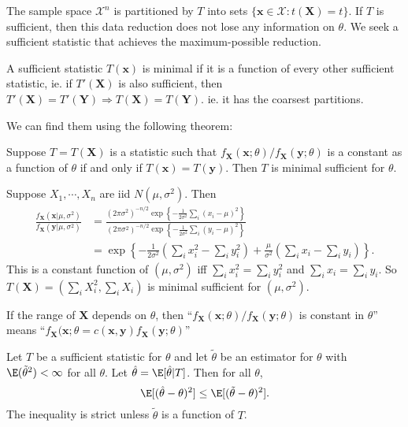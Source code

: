 \documentclass[a4paper]{article}
\begin{document}
The sample space $\mathcal{X}^n$ is partitioned by $T$ into sets $\{\mathbf{x}\in \mathcal{X}: t(\mathbf{X}) = t\}$. If $T$ is sufficient, then this data reduction does not lose any information on $\theta$. We seek a sufficient statistic that achieves the maximum-possible reduction.

\begin{defi}
  A sufficient statistic $T(\mathbf{x})$ is minimal if it is a function of every other sufficient statistic, ie. if $T'(\mathbf{X})$ is also sufficient, then $T'(\mathbf{X}) = T'(\mathbf{Y}) \Rightarrow  T(\mathbf{X}) = T(\mathbf{Y})$. ie. it has the coarsest partitions.
\end{defi}

We can find them using the following theorem:
\begin{thm}
  Suppose $T = T(\mathbf{X})$ is a statistic such that $f_\mathbf{X}(\mathbf{x}; \theta)/f_\mathbf{X}(\mathbf{y}; \theta)$ is a constant as a function of $\theta$ if and only if $T(\mathbf{x}) = T(\mathbf{y})$. Then $T$ is minimal sufficient for $\theta$.
\end{thm}

\begin{eg}
  Suppose $X_1, \cdots, X_n$ are iid $N(\mu, \sigma^2)$. Then
  \begin{align*}
    \frac{f_\mathbf{X}(\mathbf{x}|\mu, \sigma^2)}{f_\mathbf{X}(\mathbf{y}|\mu, \sigma^2)} &= \frac{(2\pi\sigma^2)^{-n/2}\exp\left\{-\frac{1}{2\sigma^2}\sum_i(x_i - \mu)^2\right\}}{(2\pi\sigma^2)^{-n/2}\exp\left\{-\frac{1}{2\sigma^2}\sum_i(y_i - \mu)^2\right\}}\\
    &=\exp\left\{-\frac{1}{2\sigma^2}\left(\sum_i x_i^2 - \sum_i y_i^2\right) + \frac{\mu}{\sigma^2}\left(\sum_{i}x_i - \sum_i y_i\right)\right\}.
  \end{align*}
  This is a constant function of $(\mu, \sigma^2)$ iff  $\sum_i x_i^2 = \sum_i y_i^2$ and $\sum_i x_i = \sum_i y_i$. So $T(\mathbf{X}) = (\sum_i X_i^2, \sum_i X_i)$ is minimal sufficient for $(\mu, \sigma^2)$.
\end{eg}
\note If the range of $\mathbf{X}$ depends on $\theta$, then ``$f_\mathbf{X}(\mathbf{x}; \theta)/f_\mathbf{X}(\mathbf{y};\theta)$ is constant in $\theta$'' means ``$f_\mathbf{X}(\mathbf{x}; \theta = c(\mathbf{x}, \mathbf{y})f_\mathbf{X}(\mathbf{y}; \theta)$''

\begin{thm}
  Let $T$ be a sufficient statistic for $\theta$ and let $\tilde{\theta}$ be an estimator for $\theta$ with $\E(\tilde{\theta}^2) < \infty$ for all $\theta$. Let $\hat{\theta} = \E[\hat{\theta}|T]$. Then for all $\theta$,
  \[
    \E[(\hat{\theta} - \theta)^2] \leq \E[(\tilde{\theta} - \theta)^2].
  \]
  The inequality is strict unless $\tilde{\theta}$ is a function of $T$.
\end{thm}
\end{document}

